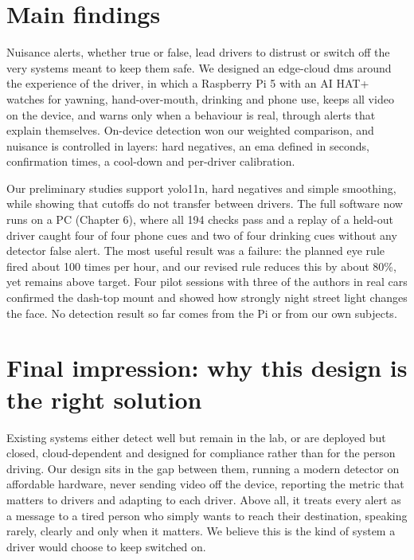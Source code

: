 \section{Main findings}

Nuisance alerts, whether true or false, lead drivers to distrust or switch off the very systems meant to keep them safe. We designed an edge-cloud \gls{dms} around the experience of the driver, in which a Raspberry Pi 5 with an AI HAT+ watches for yawning, hand-over-mouth, drinking and phone use, keeps all video on the device, and warns only when a behaviour is real, through alerts that explain themselves. On-device detection won our weighted comparison, and nuisance is controlled in layers: hard negatives, an \gls{ema} defined in seconds, confirmation times, a cool-down and per-driver calibration.

Our preliminary studies support \gls{yolo}11n, hard negatives and simple smoothing, while showing that cutoffs do not transfer between drivers. The full software now runs on a PC (Chapter 6), where all 194 checks pass and a replay of a held-out driver caught four of four phone cues and two of four drinking cues without any detector false alert. The most useful result was a failure: the planned eye rule fired about 100 times per hour, and our revised rule reduces this by about 80\%, yet remains above target. Four pilot sessions with three of the authors in real cars confirmed the dash-top mount and showed how strongly night street light changes the face. No detection result so far comes from the Pi or from our own subjects.




\section{Final impression: why this design is the right solution}

Existing systems either detect well but remain in the lab, or are deployed but closed, cloud-dependent and designed for compliance rather than for the person driving. Our design sits in the gap between them, running a modern detector on affordable hardware, never sending video off the device, reporting the metric that matters to drivers and adapting to each driver. Above all, it treats every alert as a message to a tired person who simply wants to reach their destination, speaking rarely, clearly and only when it matters. We believe this is the kind of system a driver would choose to keep switched on.

